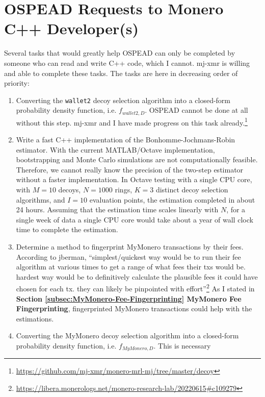 \documentclass[english]{article}
\begin{document}
\section{OSPEAD Requests to Monero C++ Developer(s)\label{sec:OSPEAD-Requests-to}}

Several tasks that would greatly help OSPEAD can only be completed
by someone who can read and write C++ code, which I cannot. mj-xmr
is willing and able to complete these tasks. The tasks are here in
decreasing order of priority:
\begin{enumerate}
\item Converting the \texttt{wallet2} decoy selection algorithm into a closed-form
probability density function, i.e. $f_{wallet2,D}$. OSPEAD cannot
be done at all without this step. mj-xmr and I have made progress
on this task already.\footnote{\href{https://github.com/mj-xmr/monero-mrl-mj/tree/master/decoy}{https://github.com/mj-xmr/monero-mrl-mj/tree/master/decoy}}
\item Write a fast C++ implementation of the Bonhomme-Jochmans-Robin estimator.
With the current MATLAB/Octave implementation, bootstrapping and Monte
Carlo simulations are not computationally feasible. Therefore, we
cannot really know the precision of the two-step estimator without
a faster implementation. In Octave testing with a single CPU core,
with $M=10$ decoys, $N=1000$ rings, $K=3$ distinct decoy selection
algorithms, and $I=10$ evaluation points, the estimation completed
in about 24 hours. Assuming that the estimation time scales linearly
with $N$, for a single week of data a single CPU core would take
about a year of wall clock time to complete the estimation.
\item Determine a method to fingerprint MyMonero transactions by their fees.
According to jberman, ``simplest/quickest way would be to run their
fee algorithm at various times to get a range of what fees their txs
would be. hardest way would be to definitively calculate the plausible
fees it could have chosen for each tx. they can likely be pinpointed
with effort''\footnote{\href{https://libera.monerologs.net/monero-research-lab/20220615\#c109279}{https://libera.monerologs.net/monero-research-lab/20220615\#c109279}}
As I stated in \textbf{Section \ref{subsec:MyMonero-Fee-Fingerprinting}
MyMonero Fee Fingerprinting}, fingerprinted MyMonero transactions
could help with the estimations.
\item Converting the MyMonero decoy selection algorithm into a closed-form
probability density function, i.e. $f_{MyMonero,D}$. This is necessary

\end{enumerate}
\end{document}
